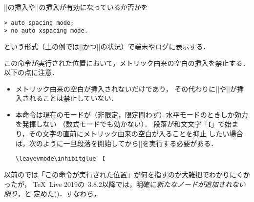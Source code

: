 \documentclass[a4paper,11pt,nomag,dvipdfmx]{jsarticle}
\begin{document}
\begin{cslist}
\csitem[\.{showmode}]
  |\kanjiskip|の挿入や|\xkanjiskip|の挿入が有効になっているか否かを
\begin{verbatim}
> auto spacing mode;
> no auto xspacing mode.
\end{verbatim}
  という形式（上の例では|\autospacing|かつ|\noautoxspacing|の状況）で端末やログに表示する．

\csitem[\.{inhibitglue}]
  この命令が実行された位置において，メトリック由来の空白の挿入を禁止する．以下の点に注意．
\begin{itemize}
 \item メトリック由来の空白が挿入されないだけであり，
       その代わりに|\kanjiskip|や|\xkanjiskip|が挿入されることは禁止していない．
 \item 本命令は現在のモードが（非限定，限定問わず）水平モードのときしか効力を発揮しない
       （数式モードでも効かない）．
       段落が和文文字「\verb+【+」で始まり，その文字の直前にメトリック由来の空白が入ることを抑止
       したい場合は，次のように一旦段落を開始してから|\inhibitglue|を実行する必要がある．
\begin{verbatim}
\leavevmode\inhibitglue 【
\end{verbatim}
\end{itemize}
  以前の\pTeX では「この命令が実行された位置」が何を指すのか大雑把でわかりにくかったが，
  \TeX~Live 2019の\pTeX~3.8.2以降では，明確に\emph{新たなノードが追加されない限り}，と
  定めた(\cite{tjb28,forum_2566})．すなわち，
\end{cslist}
\end{document}
